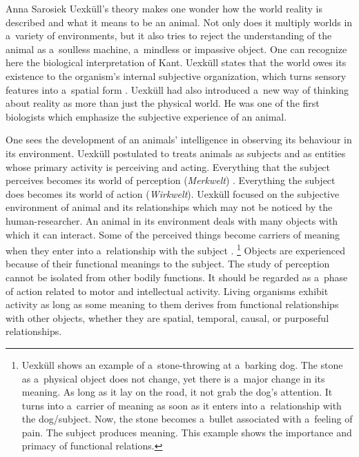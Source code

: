 \begin{artengenv}{Anna Sarosiek}
Uexküll's theory makes one wonder how the world reality is described and what it means to be an animal. Not only does it multiply worlds in a~variety of environments, but it also tries to reject the understanding of the animal as a~soulless machine, a~mindless or impassive object. One can recognize here the biological interpretation of Kant. Uexküll states that the world owes its existence to the organism’s internal subjective organization, which turns sensory features into a~spatial form
\parencite[][p.12]{uexkull_theoretische_1920}. %
 Uexküll had also introduced a~new way of thinking about reality as more than just the physical world. He was one of the first biologists which emphasize the subjective experience of an animal.

One sees the development of an animals’ intelligence in observing its behaviour in its environment. Uexküll postulated to treats animals as subjects and as entities whose primary activity is perceiving and acting. Everything that the subject perceives becomes its world of perception (\textit{Merkwelt})
\parencite[][pp.26–28]{uexkull_streifzuge_1934}. %
 Everything the subject does becomes its world of action (\textit{Wirkwelt}). Uexküll focused on the subjective environment of animal and its relationships which may not be noticed by the human-researcher. An animal in its environment deals with many objects with which it can interact. Some of the perceived things become carriers of meaning when they enter into a~relationship with the subject 
\parencite[][pp.105–107]{uexkull_streifzuge_1934}.%
\footnote{Uexküll shows an example of a~stone-throwing at a~barking dog. The stone as a~physical object does not change, yet there is a~major change in its meaning. As long as it lay on the road, it not grab the dog's attention. It turns into a~carrier of meaning as soon as it enters into a~relationship with the dog/subject. Now, the stone becomes a~bullet associated with a~feeling of pain. The subject produces meaning. This example shows the importance and primacy of functional relations.} Objects are experienced because of their functional meanings to the subject. The study of perception cannot be isolated from other bodily functions. It should be regarded as a~phase of action related to motor and intellectual activity. Living organisms exhibit activity as long as some meaning to them derives from functional relationships with other objects, whether they are spatial, temporal, causal, or purposeful relationships.


\end{artengenv}
